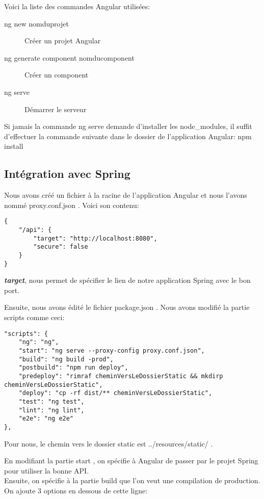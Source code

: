 Voici la liste des commandes Angular utilisées:

\begin{description}
	\item[ng new nomduprojet] Créer un projet Angular
	\item[ng generate component nomducomponent] Créer un component
	\item[ng serve] Démarrer le serveur
\end{description}

Si jamais la commande \og{}ng serve\fg{} demande d'installer les node\_modules, il suffit d'effectuer la commande suivante dans le dossier de l'application Angular: npm install

\subsection{Intégration avec Spring}

Nous avons créé un fichier à la racine de l'application Angular et nous l'avons nommé \og{}proxy.conf.json \fg{}. Voici son contenu:

\begin{lstlisting}
{
    "/api": {
        "target": "http://localhost:8080",
        "secure": false
    }
}
\end{lstlisting}

\textbf{\textit{target}}, nous permet de spécifier le lien de notre application Spring avec le bon port.

\clearpage

Ensuite, nous avons édité le fichier \og{}package.json \fg{}. Nous avons modifié la partie \og{}scripts \fg{} comme ceci:

\begin{lstlisting}
"scripts": {
    "ng": "ng",
    "start": "ng serve --proxy-config proxy.conf.json",
    "build": "ng build -prod",
    "postbuild": "npm run deploy",
    "predeploy": "rimraf cheminVersLeDossierStatic && mkdirp cheminVersLeDossierStatic",
    "deploy": "cp -rf dist/** cheminVersLeDossierStatic",
    "test": "ng test",
    "lint": "ng lint",
    "e2e": "ng e2e"
},
\end{lstlisting}

Pour nous, le chemin vers le dossier static est \og{}../resources/static/ \fg{}.

En modifiant la partie \og{}start \fg{}, on spécifie à Angular de passer par le projet Spring pour utiliser la bonne API\@. \\
Ensuite, on spécifie à la partie \og{}build \fg{} que l'on veut une compilation de production. \\
On ajoute 3 options en dessous de cette ligne:

